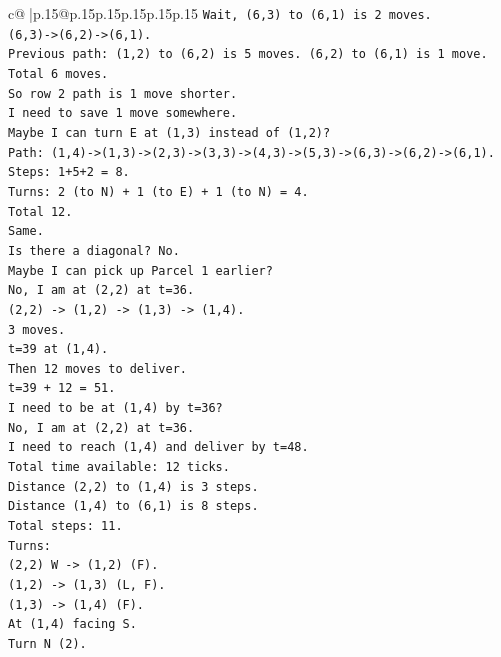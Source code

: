 \documentclass{article}
\begin{document}
{\begin{supertabular}{c@{$\;$}|p{.15\linewidth}@{}p{.15\linewidth}p{.15\linewidth}p{.15\linewidth}p{.15\linewidth}p{.15\linewidth}}
{{{\texttt{Wait, (6,3) to (6,1) is 2 moves.} \\
\texttt{(6,3){-}>(6,2){-}>(6,1).} \\
\texttt{Previous path: (1,2) to (6,2) is 5 moves. (6,2) to (6,1) is 1 move.} \\
\texttt{Total 6 moves.} \\
\texttt{So row 2 path is 1 move shorter.} \\
\texttt{I need to save 1 move somewhere.} \\
\texttt{Maybe I can turn E at (1,3) instead of (1,2)?} \\
\texttt{Path: (1,4){-}>(1,3){-}>(2,3){-}>(3,3){-}>(4,3){-}>(5,3){-}>(6,3){-}>(6,2){-}>(6,1).} \\
\texttt{Steps: 1+5+2 = 8.} \\
\texttt{Turns: 2 (to N) + 1 (to E) + 1 (to N) = 4.} \\
\texttt{Total 12.} \\
\texttt{Same.} \\
\texttt{Is there a diagonal? No.} \\
\texttt{Maybe I can pick up Parcel 1 earlier?} \\
\texttt{No, I am at (2,2) at t=36.} \\
\texttt{(2,2) {-}> (1,2) {-}> (1,3) {-}> (1,4).} \\
\texttt{3 moves.} \\
\texttt{t=39 at (1,4).} \\
\texttt{Then 12 moves to deliver.} \\
\texttt{t=39 + 12 = 51.} \\
\texttt{I need to be at (1,4) by t=36?} \\
\texttt{No, I am at (2,2) at t=36.} \\
\texttt{I need to reach (1,4) and deliver by t=48.} \\
\texttt{Total time available: 12 ticks.} \\
\texttt{Distance (2,2) to (1,4) is 3 steps.} \\
\texttt{Distance (1,4) to (6,1) is 8 steps.} \\
\texttt{Total steps: 11.} \\
\texttt{Turns:} \\
\texttt{(2,2) W {-}> (1,2) (F).} \\
\texttt{(1,2) {-}> (1,3) (L, F).} \\
\texttt{(1,3) {-}> (1,4) (F).} \\
\texttt{At (1,4) facing S.} \\
\texttt{Turn N (2).} \\
}}}
\end{supertabular}}
\end{document}
